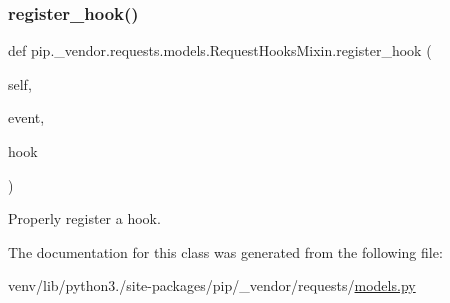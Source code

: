 \subsubsection{\texorpdfstring{register\+\_\+hook()}{register\_hook()}}
{\footnotesize\ttfamily def pip.\+\_\+vendor.\+requests.\+models.\+Request\+Hooks\+Mixin.\+register\+\_\+hook (\begin{DoxyParamCaption}\item[{}]{self,  }\item[{}]{event,  }\item[{}]{hook }\end{DoxyParamCaption})}

\begin{DoxyVerb}Properly register a hook.\end{DoxyVerb}
 

The documentation for this class was generated from the following file\+:\begin{DoxyCompactItemize}
\item 
venv/lib/python3./site-\/packages/pip/\+\_\+vendor/requests/\hyperlink{__vendor_2requests_2models_8py}{models.\+py}\end{DoxyCompactItemize}
